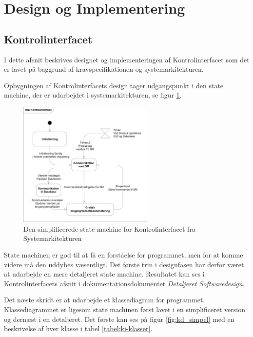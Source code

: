\section{Design og Implementering}
\label{ch:DesignImplementering}

\subsection{Kontrolinterfacet}
I dette afsnit beskrives designet og implementeringen af Kontrolinterfacet som det er lavet på baggrund af kravspecifikationen og systemarkitekturen. 

Opbygningen af Kontrolinterfacets design tager udgangspunkt i den state machine, der er udarbejdet i systemarkitekturen, se figur \ref{fig:KI-stm}.

\begin{figure}[htbp]
\centering
\includegraphics[width=0.6\textwidth]{billeder/KI/stm_ki}
\caption{Den simplificerede state machine for Kontrolinterfacet fra Systemarkitekturen}
\label{fig:KI-stm}
\end{figure}

State machinen er god til at få en forståelse for programmet, men for at komme videre må den uddybes væsentligt. Det første trin i designfasen har derfor været at udarbejde en mere detaljeret state machine. Resultatet kan ses i Kontrolinterfacets afsnit i dokumentationsdokumentet \textit{Detaljeret Softwaredesign}.

Det næste skridt er at udarbejde et klassediagram for programmet. Klassediagrammet er ligesom state machinen først lavet i en simplificeret version og dernæst i en detaljeret. Det første kan ses på figur \ref{fig:kd_simpel} med en beskrivelse af hver klasse i tabel \ref{tabel:ki-klasser}.\\


